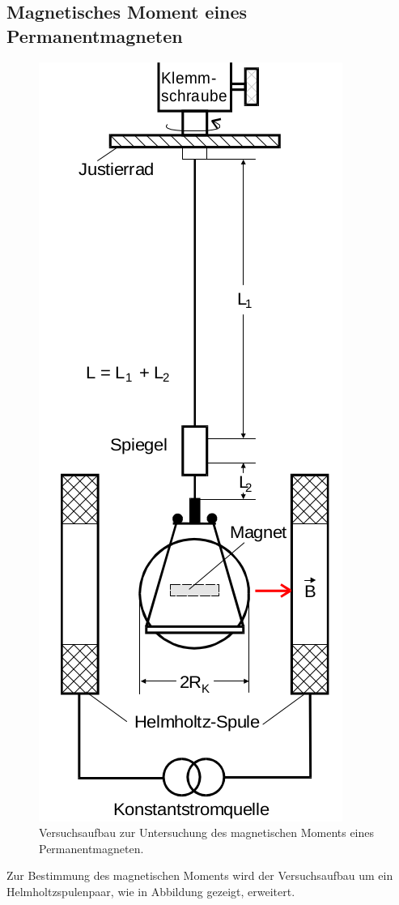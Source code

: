 \floatBarrier
\subsection{Magnetisches Moment eines Permanentmagneten}

\begin{figure}
	\centering
	\includegraphics{Bilder/helmholtz.png}
	\caption{Versuchsaufbau zur Untersuchung des magnetischen Moments eines Permanentmagneten. \cite{Anleitung}}
	\label{fig:helmholtz}
\end{figure}
Zur Bestimmung des magnetischen Moments wird der Versuchsaufbau um ein Helmholtzspulenpaar, wie in Abbildung  gezeigt, erweitert.
